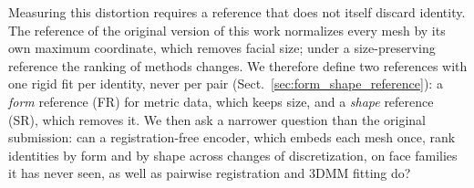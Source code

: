 \documentclass[10pt,twocolumn,letterpaper]{article}
\begin{document}
Measuring this distortion requires a reference that does not itself discard identity. The reference of the original version of this work normalizes every mesh by its own maximum coordinate, which removes facial size; under a size-preserving reference the ranking of methods changes. %
 We therefore define two references with one rigid fit per identity, never per pair (Sect.~\ref{sec:form_shape_reference}): a \emph{form} reference (FR) for metric data, which keeps size, and a \emph{shape} reference (SR), which removes it. We then ask a narrower question than the original submission: can a registration-free encoder, which embeds each mesh once, rank identities by form and by shape across changes of discretization, on face families it has never seen, as well as pairwise registration and 3DMM fitting do?
\end{document}

